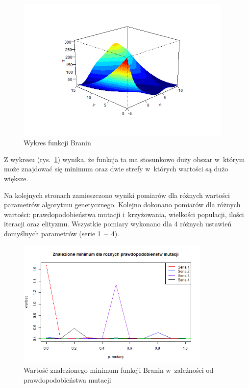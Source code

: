 \documentclass[11pt, a4paper]{article}
\newcommand{\fbi}{\leavevmode{\parindent=1em\indent}}
\begin{document}
\begin{figure}[H]
	\centering
	\includegraphics[width=0.95\textwidth]{./assets/Branin1.png}
	\caption{Wykres funkcji Branin}
	\label{fig:branin1}
\end{figure}

\fbi
Z wykresu (rys.~\ref{fig:branin1}) wynika, że funkcja ta ma stosunkowo duży obszar w~którym może znajdować się minimum oraz dwie strefy w~których wartości są dużo większe.

\fbi
Na kolejnych stronach zamieszczono wyniki pomiarów dla różnych wartości parametrów algorytmu genetycznego. Kolejno dokonano pomiarów dla różnych wartości: prawdopodobieństwa mutacji i~krzyżowania, wielkości populacji, ilości iteracji oraz elityzmu. Wszystkie pomiary wykonano dla 4 różnych ustawień domyślnych parametrów (serie 1~--~4).

\newpage
\begin{figure}[H]
	\centering
	\includegraphics[width=0.85\textwidth]{./assets/Branin2.png}
	\caption{Wartość znalezionego minimum funkcji Branin w~zależności od prawdopodobieństwa mutacji}
	\label{fig:branin2}
\end{figure}
\end{document}

